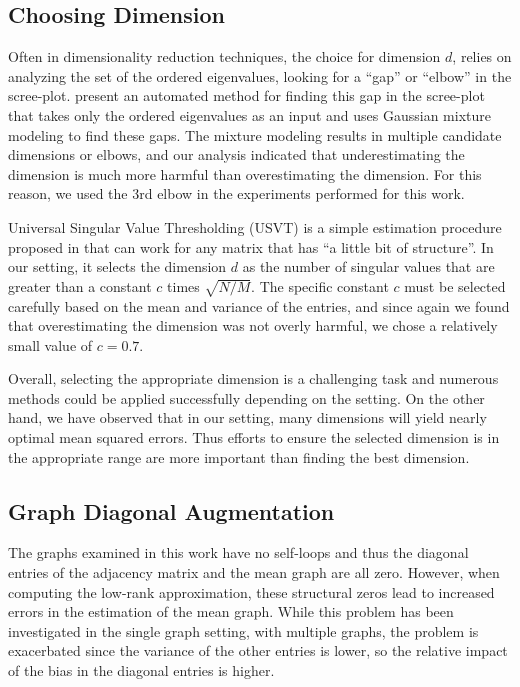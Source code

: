 \documentclass[10pt,letterpaper]{article}
\begin{document}
\subsection{Choosing Dimension}
\label{section:dim_select}
Often in dimensionality reduction techniques, the choice for dimension $d$, relies on analyzing the set of the ordered eigenvalues, looking for a ``gap'' or ``elbow'' in the scree-plot. \citet{zhu2006automatic} present an automated method for finding this gap in the scree-plot that takes only the ordered eigenvalues as an input and uses Gaussian mixture modeling to find these gaps.
The mixture modeling results in multiple candidate dimensions or elbows, and our analysis indicated that underestimating the dimension is much more harmful than overestimating the dimension.
For this reason, we used the 3rd elbow in the experiments performed for this work.

Universal Singular Value Thresholding (USVT) is a simple estimation procedure proposed in \citet{chatterjee2015matrix} that can work for any matrix that has ``a little bit of structure''. 
In our setting, it selects the dimension $d$ as the number of singular values that are greater than a constant $c$ times $\sqrt{N/M}$.
The specific constant $c$ must be selected carefully based on the mean and variance of the entries, and since again we found that overestimating the dimension was not overly harmful, we chose a relatively small value of $c=0.7$.

Overall, selecting the appropriate dimension is a challenging task and numerous methods could be applied successfully depending on the setting.
On the other hand, we have observed that in our setting, many dimensions will yield nearly optimal mean squared errors. 
Thus efforts to ensure the selected dimension is in the appropriate range are more important than finding the best dimension.



\subsection{Graph Diagonal Augmentation}
\label{section:diag_aug}
The graphs examined in this work have no self-loops and thus the diagonal entries of the adjacency matrix and the mean graph are all zero.
However, when computing the low-rank approximation, these structural zeros lead to increased errors in the estimation of the mean graph. 
While this problem has been investigated in the single graph setting, with multiple graphs, the problem is exacerbated since the variance of the other entries is lower, so the relative impact of the bias in the diagonal entries is higher.
\end{document}
